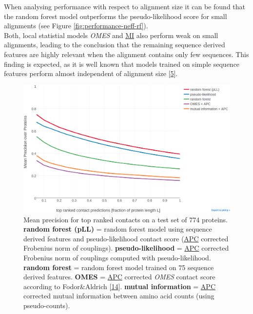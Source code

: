 \documentclass[12pt,a4paper,twoside]{book}
\theoremstyle{definition}
\theoremstyle{definition}
\theoremstyle{remark}
\begin{document}
When analysing performance with respect to alignment size it can be
found that the random forest model outperforms the pseudo-likelihood
score for small alignments (see Figure \ref{fig:performance-neff-rf}).\\
Both, local statistial models \emph{OMES} and
\protect\hyperlink{abbrev}{MI} also perform weak on small alignments,
leading to the conclusion that the remaining sequence derived features
are highly relevant when the alignment contains only few sequences. This
finding is expected, as it is well known that models trained on simple
sequence features perform almost independent of alignment size
{[}\protect\hyperlink{ref-Stahl2017}{5}{]}.














\begin{figure}
\includegraphics[width=1\linewidth]{img/random_forest_contact_prior/precision_vs_rank_notitle} \caption{Mean precision for top ranked contacts on a
test set of 774 proteins. \textbf{random forest (pLL)} = random forest
model using sequence derived features and pseudo-likelihood contact
score (\protect\hyperlink{abbrev}{APC} corrected Frobenius norm of
couplings). \textbf{pseudo-likelihood} = \protect\hyperlink{abbrev}{APC}
corrected Frobenius norm of couplings computed with pseudo-likelihood.
\textbf{random forest} = random forest model trained on 75 sequence
derived features. \textbf{OMES} = \protect\hyperlink{abbrev}{APC}
corrected \emph{OMES} contact score according to Fodor\&Aldrich
{[}\protect\hyperlink{ref-Fodor2004a}{14}{]}. \textbf{mutual
information} = \protect\hyperlink{abbrev}{APC} corrected mutual
information between amino acid counts (using pseudo-counts).}\label{fig:performance-rf}
\end{figure}
\end{document}
